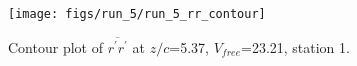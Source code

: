 \begin{figure}[H]
\centering
\texttt{[image: figs/run\_5/run\_5\_rr\_contour]}
\caption{Contour plot of $\overline{r^\prime r^\prime}$ at $z/c$=5.37, $V_{free}$=23.21, station 1.}
\label{fig:run_5_rr_contour}
\end{figure}


